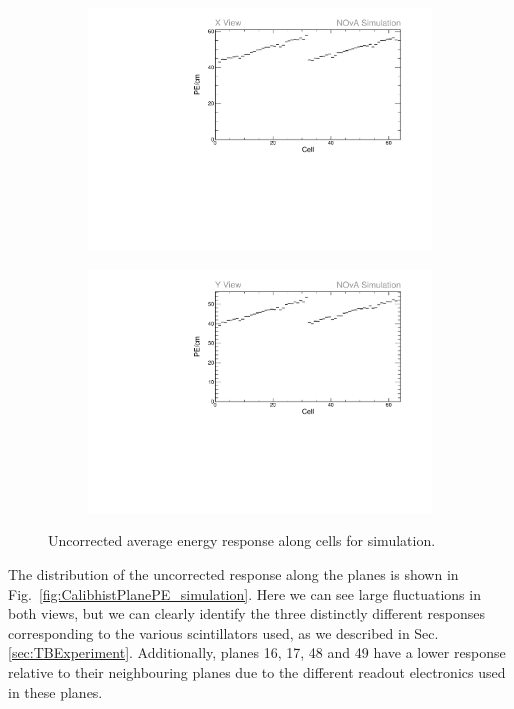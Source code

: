 \begin{figure}[h]
\centering
\begin{subfigure}[b]{0.495\textwidth}
\centering
\includegraphics[width=\textwidth]{Plots/TBCalibration/Attenprofs_Simulation_CellPE_X_Prof.pdf}
\end{subfigure}
\begin{subfigure}[b]{0.495\textwidth}
\centering
\includegraphics[width=\textwidth]{Plots/TBCalibration/Attenprofs_Simulation_CellPE_Y_Prof.pdf}
\end{subfigure}
\caption{Uncorrected average energy response along cells for simulation.}
\label{fig:CalibhistCellPE_simulation}
\end{figure}

The distribution of the uncorrected response along the planes is shown in Fig.~\ref{fig:CalibhistPlanePE_simulation}. Here we can see large fluctuations in both views, but we can clearly identify the three distinctly different responses corresponding to the various scintillators used, as we described in Sec.\ref{sec:TBExperiment}. Additionally, planes 16, 17, 48 and 49 have a lower response relative to their neighbouring planes due to the different readout electronics used in these planes.

